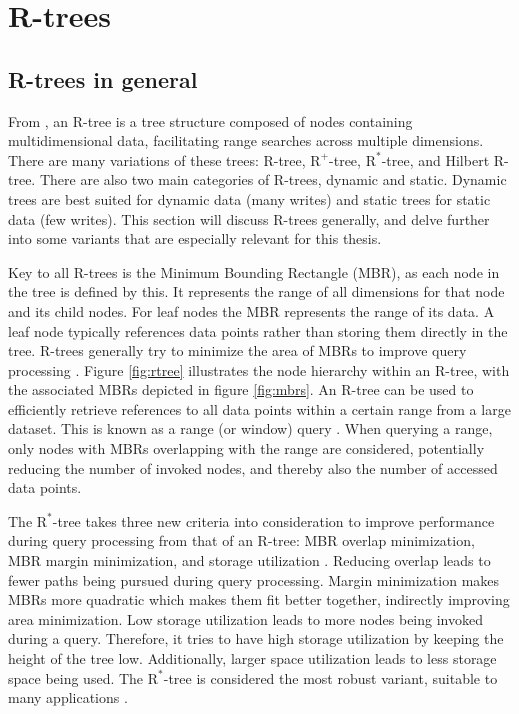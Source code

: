 \section{R-trees}
\label{sec:rtree}

\subsection{R-trees in general}
From \textcite{rtree}, an R-tree is a tree structure composed of nodes containing multidimensional data, facilitating range searches across multiple dimensions. There are many variations of these trees: R-tree, $\text{R}^+$-tree, $\text{R}^*$-tree, and Hilbert R-tree. There are also two main categories of R-trees, dynamic and static. Dynamic trees are best suited for dynamic data (many writes) and static trees for static data (few writes). This section will discuss R-trees generally, and delve further into some variants that are especially relevant for this thesis.

Key to all R-trees is the Minimum Bounding Rectangle (MBR), as each node in the tree is defined by this. It represents the range of all dimensions for that node and its child nodes. For leaf nodes the MBR represents the range of its data. A leaf node typically references data points rather than storing them directly in the tree. R-trees generally try to minimize the area of MBRs to improve query processing \cite{rtree}. Figure \ref{fig:rtree} illustrates the node hierarchy within an R-tree, with the associated MBRs depicted in figure \ref{fig:mbrs}. An R-tree can be used to efficiently retrieve references to all data points within a certain range from a large dataset. This is known as a range (or window) query \cite{rtree}. When querying a range, only nodes with MBRs overlapping with the range are considered, potentially reducing the number of invoked nodes, and thereby also the number of accessed data points.

The $\text{R}^*$-tree takes three new criteria into consideration to improve performance during query processing from that of an R-tree: MBR overlap minimization, MBR margin minimization, and storage utilization \cite{rtree}. Reducing overlap leads to fewer paths being pursued during query processing. Margin minimization makes MBRs more quadratic which makes them fit better together, indirectly improving area minimization. Low storage utilization leads to more nodes being invoked during a query. Therefore, it tries to have high storage utilization by keeping the height of the tree low. Additionally, larger space utilization leads to less storage space being used. The $\text{R}^*$-tree is considered the most robust variant, suitable to many applications \cite{rtree}.

